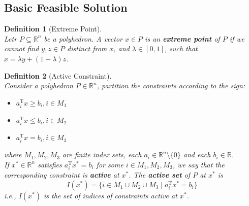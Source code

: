 \documentclass[12pt]{article}
\newcommand{\T}{\mathrm{T}}
\newtheorem{definition}{Definition}[section]
\theoremstyle{definition}
\begin{document}
\subsection{Basic Feasible Solution}
\begin{definition}[Extreme Point]
\hfill\\\normalfont Letr $P\subseteq \mathbb{R}^n$ be a polyhedron. A vector $x\in P$ is an \textbf{extreme point} of $P$ if we cannot find $y,z\in P$ distinct from $x$, and $\lambda\in[0,1]$, such that $x=\lambda y+(1-\lambda)z$.
\end{definition}
\begin{definition}[Active Constraint]
\hfill\\\normalfont 
Consider a polyhedron $P\in\mathbb{R}^n$, partition the constraints according to the sign:
\begin{itemize}
  \item $a_i^\T x\geq b_i, i\in M_1$
  \item $a_i^\T x\leq b_i, i\in M_2$
  \item $a_i^\T x= b_i, i\in M_3$
\end{itemize}
where $M_1, M_2, M_3$ are finite index sets, each $a_i\in\mathbb{R}^n\setminus\{0\}$ and each $b_i\in \mathbb{R}$.\\
If $x^\ast\in\mathbb{R}^n$ satisfies $a_i^\T x^\ast = b_i$ for some $i\in M_1, M_2, M_3$, we say that the corresponding constraint is \textbf{active} at $x^\ast$. The \textbf{active set} of $P$ at $x^\ast$ is
\[
I(x^\ast) = \{i\in M_1\cup M_2\cup M_3\mid a_i^\T x^\ast = b_i\}
\]
i.e., $I(x^\ast)$ is the set of indices of constraints active at $x^\ast$.
\end{definition}
\end{document}
